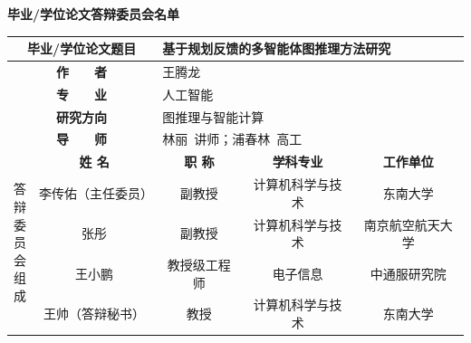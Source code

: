 \clearpage
{}
{}
\thispagestyle{seustyle}
\begin{center}
    \xiaoerhao\songti\bfseries 毕业/学位论文答辩委员会名单
\end{center}

\begin{table}[h]
\renewcommand\arraystretch{1.3}
\centering
\begin{tabular}{|cc|ccc|}
\hline
\multicolumn{2}{|c|}{\textbf{毕业/学位论文题目}} & \multicolumn{3}{l|}{基于规划反馈的多智能体图推理方法研究} \\ \hline
\multicolumn{2}{|c|}{\textbf{作　　者}} & \multicolumn{3}{l|}{王腾龙} \\ \hline
\multicolumn{2}{|c|}{\textbf{专　　业}} & \multicolumn{3}{l|}{人工智能} \\ \hline
\multicolumn{2}{|c|}{\textbf{研究方向}} & \multicolumn{3}{l|}{图推理与智能计算} \\ \hline
\multicolumn{2}{|c|}{\textbf{导　　师}} & \multicolumn{3}{l|}{林丽\ 讲师；浦春林\ 高工} \\ \hline
\multicolumn{1}{|c|}{\multirow{5}{*}{\bfseries \parbox[c][4.2cm][c]{1em}{\centering 答\\辩\\委\\员\\会\\组\\成}}}
& \rule{0pt}{0.78cm}\textbf{姓  名} & \multicolumn{1}{c|}{\textbf{职  称}} & \multicolumn{1}{c|}{\textbf{学科专业}} & \textbf{工作单位} \\ \cline{2-5}
\multicolumn{1}{|c|}{} & \rule{0pt}{0.78cm}李传佑（主任委员） & \multicolumn{1}{c|}{副教授} & \multicolumn{1}{c|}{计算机科学与技术} & 东南大学 \\ \cline{2-5}
\multicolumn{1}{|c|}{} & \rule{0pt}{0.78cm}张彤 & \multicolumn{1}{c|}{副教授} & \multicolumn{1}{c|}{计算机科学与技术} & 南京航空航天大学 \\ \cline{2-5}
\multicolumn{1}{|c|}{} & \rule{0pt}{0.78cm}王小鹏 & \multicolumn{1}{c|}{教授级工程师} & \multicolumn{1}{c|}{电子信息} & 中通服研究院 \\ \cline{2-5}
\multicolumn{1}{|c|}{} & \rule{0pt}{0.78cm}王帅（答辩秘书） & \multicolumn{1}{c|}{教授} & \multicolumn{1}{c|}{计算机科学与技术} & 东南大学 \\ \hline
\end{tabular}
\end{table}
